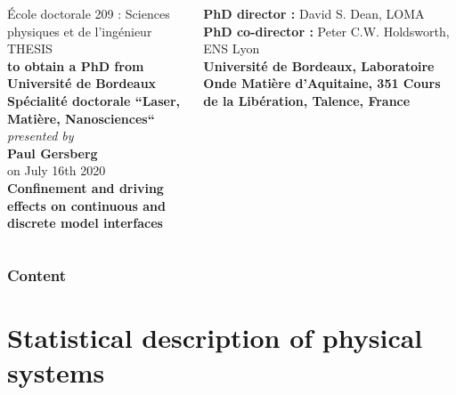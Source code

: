 \documentclass[9pt, dvipsnames,aspectratio=169]{beamer} %
\begin{document}
\begin{frame}
\begin{columns}
    \centering
    {École doctorale 209 : Sciences physiques et de l'ingénieur}\\
    \vfill
    { THESIS}\\
    {\bfseries \scriptsize to obtain a PhD from}\\
    {\bfseries Université de Bordeaux}\\
    {{\bfseries Spécialité doctorale ``Laser, Matière, Nanosciences``}}\\
    \textit{\scriptsize presented by }\\
    {{\Large \bfseries Paul Gersberg}} \\
    {\scriptsize on July 16th 2020} \\
    \vfill
    {\huge \color[rgb]{0,0,1} \bfseries{Confinement and driving effects on continuous and discrete model interfaces}} \\
    \vspace{2cm}
    \raggedright
    {\bf PhD director :} David S. Dean, LOMA \\
    {\bf PhD co-director :} Peter C.W. Holdsworth, ENS Lyon \\
    \textbf{\scriptsize Université de Bordeaux, Laboratoire Onde Matière d'Aquitaine, 351 Cours de la Libération, Talence, France}
	\end{columns}
\end{frame}

\begin{frame}
    \frametitle{Content}
    \tableofcontents
\end{frame}

\section{Statistical description of physical systems}
\end{document}
